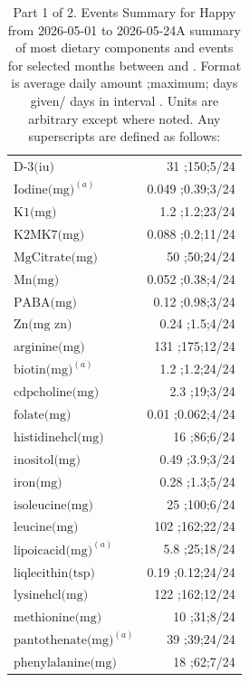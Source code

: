 \begin{table}[H]
\begin{tabular}{|l|r|}
$\textrm{D-3(iu)}$&31 ;150;5/24\\
$\textrm{Iodine(mg)}^{\left(a\right)}$&0.049 ;0.39;3/24\\
$\textrm{K1(mg)}$&1.2 ;1.2;23/24\\
$\textrm{K2MK7(mg)}$&0.088 ;0.2;11/24\\
$\textrm{MgCitrate(mg)}$&50 ;50;24/24\\
$\textrm{Mn(mg)}$&0.052 ;0.38;4/24\\
$\textrm{PABA(mg)}$&0.12 ;0.98;3/24\\
$\textrm{Zn(mg~zn)}$&0.24 ;1.5;4/24\\
$\textrm{arginine(mg)}$&131 ;175;12/24\\
$\textrm{biotin(mg)}^{\left(a\right)}$&1.2 ;1.2;24/24\\
$\textrm{cdpcholine(mg)}$&2.3 ;19;3/24\\
$\textrm{folate(mg)}$&0.01 ;0.062;4/24\\
$\textrm{histidinehcl(mg)}$&16 ;86;6/24\\
$\textrm{inositol(mg)}$&0.49 ;3.9;3/24\\
$\textrm{iron(mg)}$&0.28 ;1.3;5/24\\
$\textrm{isoleucine(mg)}$&25 ;100;6/24\\
$\textrm{leucine(mg)}$&102 ;162;22/24\\
$\textrm{lipoicacid(mg)}^{\left(a\right)}$&5.8 ;25;18/24\\
$\textrm{liqlecithin(tsp)}$&0.19 ;0.12;24/24\\
$\textrm{lysinehcl(mg)}$&122 ;162;12/24\\
$\textrm{methionine(mg)}$&10 ;31;8/24\\
$\textrm{pantothenate(mg)}^{\left(a\right)}$&39 ;39;24/24\\
$\textrm{phenylalanine(mg)}$&18 ;62;7/24\\
\hline
\end{tabular}
\caption{Part 1 of 2.  Events Summary for Happy   from 2026-05-01 to 2026-05-24A summary of most dietary components and events  for selected months between \mjmdateminn and \mjmdatemaxn. Format is average daily amount ;maximum; days given/ days in interval . Units are arbitrary except where noted. Any  superscripts are defined as follows:  \mjmsuperscriptsn}
\end{table}
